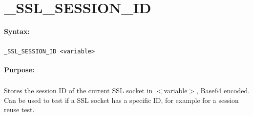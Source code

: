 
\newpage
\section{\_SSL\_SESSION\_ID}
\label{cmd:_SSL_SESSION_ID}

\paragraph{Syntax:}
\subparagraph{}
\texttt{\_SSL\_SESSION\_ID <variable>}

\paragraph{Purpose:}
\subparagraph{}
Stores the session ID of the current SSL socket in $<$variable$>$, 
Base64 encoded. Can be used to test if a SSL socket has a specific ID, for example for a session reuse test.
